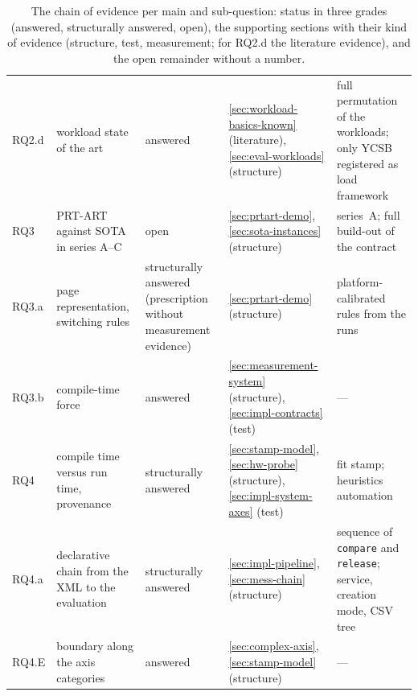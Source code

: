\begin{table}[htbp]
\begin{tabular}{@{}>{\raggedright\arraybackslash}p{1.3cm}>{\raggedright\arraybackslash}p{3.0cm}>{\raggedright\arraybackslash}p{2.0cm}>{\raggedright\arraybackslash}p{4.4cm}>{\raggedright\arraybackslash}p{3.3cm}@{}}
RQ2.d & workload state of the art & answered & {\ref{sec:workload-basics-known}} (literature), {\ref{sec:eval-workloads}} (structure) & full permutation of the workloads; only YCSB registered as load framework \\
RQ3 & PRT-ART against SOTA in series A--C & open & {\ref{sec:prtart-demo}}, {\ref{sec:sota-instances}} (structure) & series~A\@; full build-out of the contract \\
RQ3.a & page representation, switching rules & structurally answered (prescription without measurement evidence) & {\ref{sec:prtart-demo}} (structure) & platform-calibrated rules from the runs \\
RQ3.b & compile-time force & answered & {\ref{sec:measurement-system}} (structure), {\ref{sec:impl-contracts}} (test) & --- \\
RQ4 & compile time versus run time, provenance & structurally answered & {\ref{sec:stamp-model}}, {\ref{sec:hw-probe}} (structure), {\ref{sec:impl-system-axes}} (test) & fit stamp; heuristics automation \\
RQ4.a & declarative chain from the XML to the evaluation & structurally answered & {\ref{sec:impl-pipeline}}, {\ref{sec:mess-chain}} (structure) & sequence of \texttt{compare} and \texttt{release}; service, creation mode, CSV tree \\
RQ4.E & boundary along the axis categories & answered & {\ref{sec:complex-axis}}, {\ref{sec:stamp-model}} (structure) & --- \\
\bottomrule
\end{tabular}
\caption{The chain of evidence per main and sub-question: status in three grades (answered,
structurally answered, open), the supporting sections with their kind of evidence (structure, test,
measurement; for RQ2.d the literature evidence), and the open remainder without a
number.}\label{tab:ff-beweiskette}
\end{table}

